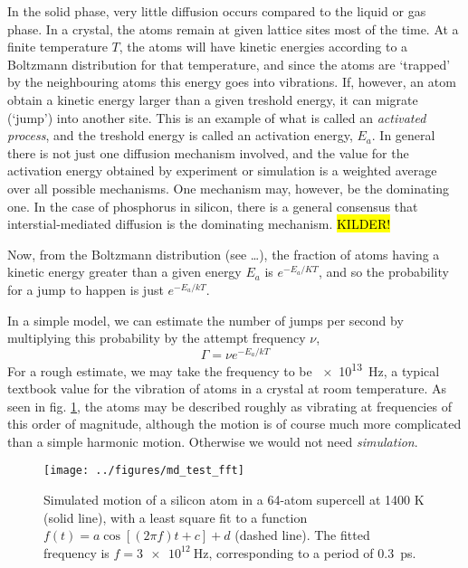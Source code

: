 \documentclass[11pt]{scrbook}   %
\newcommand{\comment}[1]{\hl{#1}}
\begin{document}
In the solid phase, very little diffusion occurs compared to the liquid or gas phase. 
In a crystal, the atoms remain at given lattice sites most of the time.
At a finite temperature $T$, the atoms will have kinetic energies according to a Boltzmann distribution for that temperature,
and since the atoms are `trapped' by the neighbouring atoms this energy goes into vibrations. 
If, however, an atom obtain a kinetic energy larger than a given treshold energy, it can migrate (`jump') into another site.
This is an example of what is called an \emph{activated process}, and the treshold energy is called an activation energy, $E_a$.
In general there is not just one diffusion mechanism involved, and the value for the activation energy obtained by experiment or simulation is a weighted average over all possible mechanisms.
One mechanism may, however, be the dominating one. In the case of phosphorus in silicon, there is a general consensus that interstial-mediated diffusion is the dominating mechanism. \comment{KILDER!}

Now, from the Boltzmann distribution (see \ldots), the fraction of atoms having a kinetic energy greater than a given energy $E_a$ is $e^{-E_a/KT}$, and so the probability for a jump to happen is just $e^{-E_a/kT}$. 

In a simple model, we can estimate the number of jumps per second by multiplying this probability by the attempt frequency $\nu$,
\begin{equation}
  \Gamma = \nu e^{-E_a/kT}
  \label{eq:jump-freq}
\end{equation}
For a rough estimate, we may take the frequency to be \SI{e13}{\hertz}, a typical textbook value for the vibration of atoms in a crystal at room temperature.
As seen in fig. \ref{fig:figures/md_test_fft}, the atoms may be described roughly as vibrating at frequencies of this order of magnitude, although the motion is of course much more complicated than a simple harmonic motion. Otherwise we would not need \emph{simulation}.

\begin{figure}[htbp]
  \begin{center}
    \texttt{[image: ../figures/md\_test\_fft]}
  \end{center}
  \caption{
    Simulated motion of a silicon atom in a 64-atom supercell at 1400 K (solid line), 
    with a least square fit to a function $f(t) = a \cos[(2\pi f)t + c] + d$ (dashed line). 
    The fitted frequency is $f=\SI{3e12}{\hertz}$, corresponding to a period of 0.3~ps.
  }
  \label{fig:figures/md_test_fft}
\end{figure}
\end{document}
